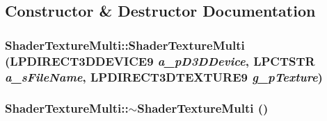 \subsection{Constructor \& Destructor Documentation}
\hypertarget{class_shader_texture_multi_a55ca9f9bfb7d65ab89cf0a41b67fbf69}{
\subsubsection[{ShaderTextureMulti}]{\setlength{\rightskip}{0pt plus 5cm}ShaderTextureMulti::ShaderTextureMulti (LPDIRECT3DDEVICE9 {\em a\_\-pD3DDevice}, \/  LPCTSTR {\em a\_\-sFileName}, \/  LPDIRECT3DTEXTURE9 {\em g\_\-pTexture})}}
\label{class_shader_texture_multi_a55ca9f9bfb7d65ab89cf0a41b67fbf69}
\hypertarget{class_shader_texture_multi_ac401c19016cd9bae283bd2b4fc91e84d}{
\subsubsection[{$\sim$ShaderTextureMulti}]{\setlength{\rightskip}{0pt plus 5cm}ShaderTextureMulti::$\sim$ShaderTextureMulti ()}}
\label{class_shader_texture_multi_ac401c19016cd9bae283bd2b4fc91e84d}


